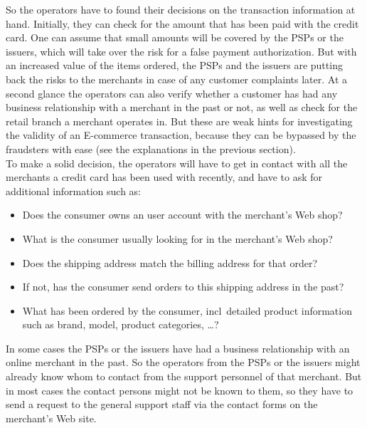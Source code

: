 So the operators have to found their decisions on the transaction information at hand. Initially, they can check for the amount that has been paid with the credit card. One can assume that small amounts will be covered by the \gls{PSP}s or the issuers, which will take over the risk for a false payment authorization. But with an increased value of the items ordered, the \gls{PSP}s and the issuers are putting back the risks to the merchants in case of any customer complaints later. At a second glance the operators can also verify whether a customer has had any business relationship with a merchant in the past or not, as well as check for the retail branch a merchant operates in. But these are weak hints for investigating the validity of an \gls{E-commerce} transaction, because they can be bypassed by the fraudsters with ease (see the explanations in the previous section). \\

To make a solid decision, the operators will have to get in contact with all the merchants a credit card has been used with recently, and have to ask for additional information such as:\@

\begin{itemize}
  \item Does the consumer owns an user account with the merchant's Web shop?
  \item What is the consumer usually looking for in the merchant's Web shop?
  \item Does the shipping address match the billing address for that order?
  \item If not, has the consumer send orders to this shipping address in the past?
  \item What has been ordered by the consumer, \gls{incl}\ detailed product information such as brand, model, product categories, \ldots?
\end{itemize}

In some cases the \gls{PSP}s or the issuers have had a business relationship with an online merchant in the past. So the operators from the \gls{PSP}s or the issuers might already know whom to contact from the support personnel of that merchant. But in most cases the contact persons might not be known to them, so they have to send a request to the general support staff via the contact forms on the merchant's Web site. \\

